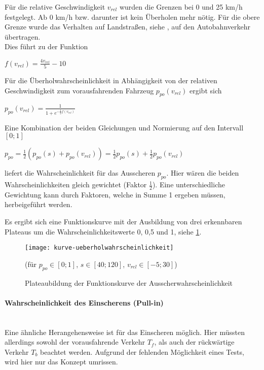\noindent
Für die relative Geschwindigkeit $ v_{rel} $ wurden die Grenzen bei 0 und 25 km/h festgelegt.
Ab 0 km/h bzw. darunter ist kein Überholen mehr nötig.
Für die obere Grenze wurde das Verhalten auf Landstraßen, siehe \cite[S. 27]{ueberholgeschwindigkeit}, auf den Autobahnverkehr übertragen.
\\
Dies führt zu der Funktion 
\begin{center}
$ f(v_{rel}) = \frac{4 v_{rel}}{5} - 10 $
\end{center}
Für die Überholwahrscheinlichkeit in Abhängigkeit von der relativen Geschwindigkeit zum vorausfahrenden Fahrzeug $ p_{po}(v_{rel}) $ ergibt sich
\begin{center}
$ p_{po}(v_{rel}) = \frac{1}{1 + e^{-\frac{1}{2}f(v_{rel})}} $
\end{center}

\noindent
Eine Kombination der beiden Gleichungen und Normierung auf den Intervall $ [0; 1] $
\begin{center}
$ p_{po} = \frac{1}{2}(p_{po}(s) + p_{po}(v_{rel})) = \frac{1}{2}p_{po}(s) + \frac{1}{2}p_{po}(v_{rel}) $
\end{center}
liefert die Wahrscheinlichkeit für das Ausscheren $ p_{po} $.
Hier wären die beiden Wahrscheinlichkeiten gleich gewichtet (Faktor $ \frac{1}{2} $). Eine unterschiedliche Gewichtung kann durch Faktoren, welche in Summe 1 ergeben müssen, herbeigeführt werden.

Es ergibt sich eine Funktionskurve mit der Ausbildung von drei erkennbaren Plateaus um die Wahrscheinlichkeitswerte 0, 0,5 und 1, siehe \cref{figure:kurve-ueberholwahrscheinlichkeit}.

\begin{figure}[hptb]
 \centering
 \texttt{[image: kurve-ueberholwahrscheinlichkeit]}
 \caption[Funktionskurve für die Ausscherwahrscheinlichkeit]
 		 {Plateaubildung der Funktionskurve der Ausscherwahrscheinlichkeit}
 		 {\footnotesize(für $ p_{po} \in [0; 1] $, $ s \in [ 40; 120 ] $, $ v_{rel} \in [ -5; 30 ] $)}
 \label{figure:kurve-ueberholwahrscheinlichkeit}
\end{figure} 


\paragraph*{Wahrscheinlichkeit des Einscherens (Pull-in)} 
\hfill \\
Eine ähnliche Herangehensweise ist für das Einscheren möglich.
Hier müssten allerdings sowohl der vorausfahrende Verkehr $ T_{f} $, als auch der rückwärtige Verkehr $ T_{b} $ beachtet werden. 
Aufgrund der fehlenden Möglichkeit eines Tests, wird hier nur das Konzept umrissen.

